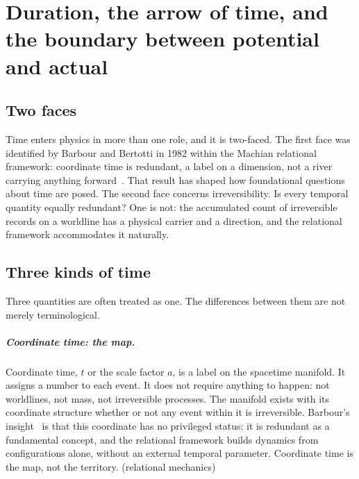 \chapter{Duration, the arrow of time, and the boundary between potential and actual}\label{ch:time}

\section{Two faces}\label{sec:time_faces}
Time enters physics in more than one role, and it is two-faced. The first face was identified by Barbour and Bertotti in 1982 within the Machian
relational framework: coordinate time is redundant, a label on a dimension, not a river carrying anything forward~\cite{BarbourBertotti1982}. That result
has shaped how foundational questions about time are posed. The second face concerns irreversibility. Is every temporal quantity equally redundant? One
is not: the accumulated count of irreversible records on a worldline has a physical carrier and a direction, and the relational framework accommodates
it naturally. \interp

\section{Three kinds of time}\label{sec:time_three}
Three quantities are often treated as one. The differences between them are not merely terminological.

\paragraph{Coordinate time: the map.} Coordinate time, $t$ or the scale factor $a$, is a label on the spacetime manifold. It assigns a number to each
event. It does not require anything to happen: not worldlines, not mass, not irreversible processes. The manifold exists with its coordinate structure
whether or not any event within it is irreversible. Barbour's insight~\cite{BarbourBertotti1982,Barbour1994} is that this coordinate has no privileged
status: it is redundant as a fundamental concept, and the relational framework builds dynamics from configurations alone, without an external temporal
parameter. Coordinate time is the map, not the territory. \derived{} (relational mechanics)

